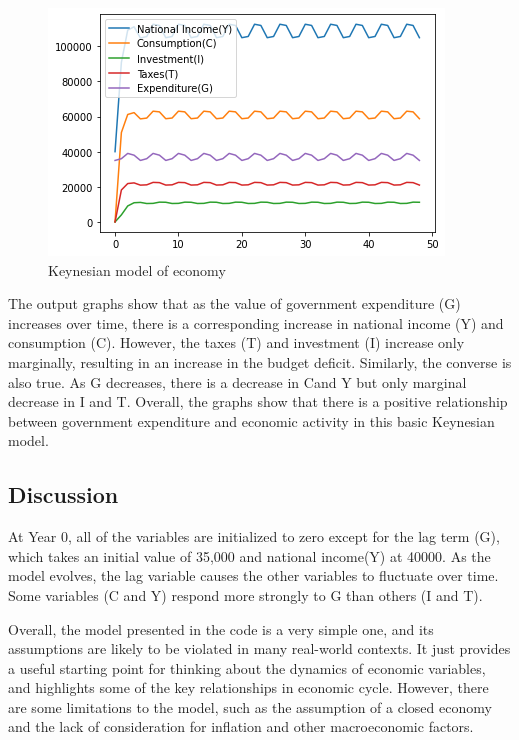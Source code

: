 \documentclass[10pt,journal,cspaper,compsoc]{IEEEtran}
\begin{document}
    \begin{figure}[h!]
      \centering
      \includegraphics[scale = 0.5]{images/Exp5_Example2.png}
      \caption{Keynesian model of economy}
    \end{figure}
    The output graphs show that as the value of government expenditure (G) increases over time, there is a corresponding increase in national income (Y) and  consumption (C). 
    However, the taxes (T) and investment (I) increase only marginally, resulting in an increase in the budget deficit. 
    Similarly, the converse is also true. As G decreases, there is a decrease in Cand Y but only marginal decrease in I and T.
    Overall, the graphs show that there is a positive relationship between government expenditure and economic activity in this basic Keynesian model. 
    \subsection{Discussion}
    At Year 0, all of the variables are initialized to zero except for the lag term (G), which takes an initial value of 35,000 and national income(Y) at 40000.
    As the model evolves, the lag variable causes the other variables to fluctuate over time. 
    Some variables (C and Y) respond more strongly to G than others (I and T).

    Overall, the model presented in the code is a very simple one, and its assumptions are likely to be violated in many real-world contexts. 
    It just provides a useful starting point for thinking about the dynamics of economic variables, and highlights some of the key relationships in economic cycle.
    However, there are some limitations to the model, such as the assumption of a closed economy and the lack of consideration for inflation and other macroeconomic factors.
\end{document}
